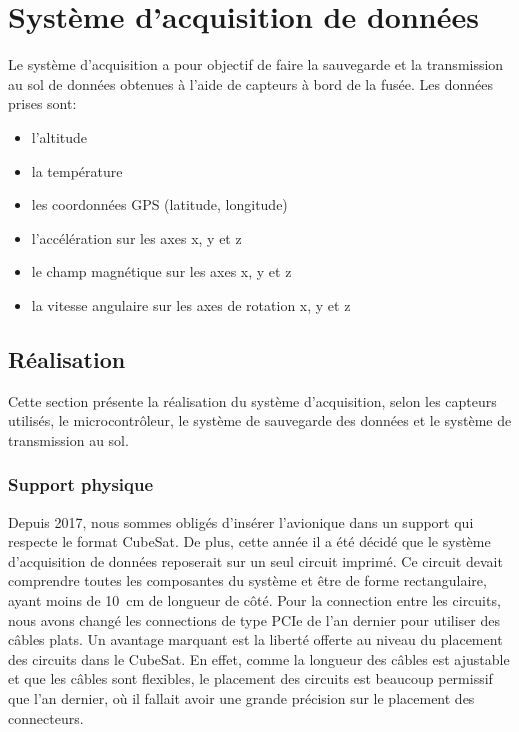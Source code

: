 \chapter{Système d'acquisition de données}
\label{chap:acquisition}

Le système d'acquisition a pour objectif de faire la sauvegarde et la
transmission au sol de données obtenues à l'aide de capteurs à bord de la fusée.
Les données prises sont:

\begin{itemize}
	\item l'altitude
	\item la température
	\item les coordonnées GPS (latitude, longitude)
	\item l'accélération sur les axes x, y et z
	\item le champ magnétique sur les axes x, y et z
	\item la vitesse angulaire sur les axes de rotation x, y et z
\end{itemize}


\section{Réalisation}

Cette section présente la réalisation du système d'acquisition, selon les
capteurs utilisés, le microcontrôleur, le système de sauvegarde des données et
le système de transmission au sol.

\subsection{Support physique}

Depuis 2017, nous sommes obligés d'insérer l'avionique dans un support qui
respecte le format CubeSat. De plus, cette année il a été décidé que le système
d'acquisition de données reposerait sur un seul circuit imprimé. Ce circuit
devait comprendre toutes les composantes du système et être de forme
rectangulaire, ayant moins de 10~cm de longueur de côté. Pour la connection
entre les circuits, nous avons changé les connections de type PCIe de l'an
dernier pour utiliser des câbles plats. Un avantage marquant est la liberté
offerte au niveau du placement des circuits dans le CubeSat. En effet, comme
la longueur des câbles est ajustable et que les câbles sont flexibles, le
placement des circuits est beaucoup permissif que l'an dernier, où il fallait
avoir une grande précision sur le placement des connecteurs.

